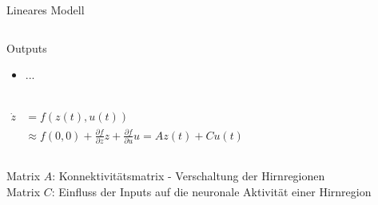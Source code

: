 \documentclass{beamer}
\begin{document}
\begin{frame}{Lineares Modell}
\begin{columns}
\begin{center}
{\begin{minipage}{\textwidth}
\begin{block}{Outputs}
\begin{itemize}
						\item ...
						\end{itemize}
					\end{block}
					\end{minipage}
				}\\
				\vspace{0.2cm}
				\begin{align*}
				\dot{z} &= f(z(t),u(t)) \\
				&\approx f(0,0)+\frac{\partial f}{\partial z}z+\frac{ \partial f}{\partial u}u =A z(t)+C u(t)
				\end{align*}
			\end{center}
		\end{columns}	
		\vspace{0.5cm}
		\begin{small}
		Matrix $A$: Konnektivitätsmatrix - Verschaltung der Hirnregionen \\
		Matrix $C$: Einfluss der Inputs auf die neuronale Aktivität einer Hirnregion
	\end{small}		 
	\end{frame}
	
\end{document}
